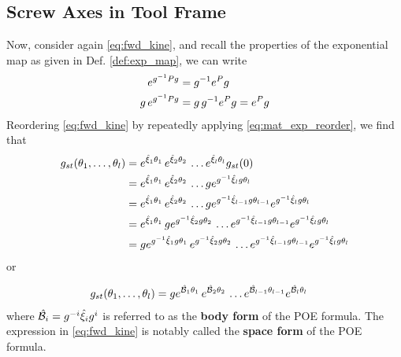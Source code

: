 \subsection{Screw Axes in Tool Frame}
%
Now, consider again \eqref{eq:fwd_kine}, and recall the properties of the exponential map as given in Def. \autoref{def:exp_map}, we can write 
%
\begin{subequations}
	\begin{align}
	e^{g^{-1}Pg} &= g^{-1} e^{P} g \\
	g \, e^{g^{-1}Pg} &= g \, g^{-1} e^{P} g = e^{P} g 
	\end{align}
	\label{eq:mat_exp_reorder}
\end{subequations}
%
Reordering \eqref{eq:fwd_kine} by repeatedly applying \eqref{eq:mat_exp_reorder}, we find that
%
\begin{subequations}
	\begin{align}
	g_{st}(\theta_1, \ldots, \theta_l) &= e^{\hat{\xi}_1 \theta_1}\,e^{\hat{\xi}_2 \theta_2}  \, \ldots e^{\hat{\xi}_l \theta_l} g_{st}(0) \\
	&= e^{\hat{\xi}_1 \theta_1}\,e^{\hat{\xi}_2 \theta_2}  \, \ldots g e^{g^{-1} \hat{\xi}_l g \theta_l}  \\
	&= e^{\hat{\xi}_1 \theta_1}\,e^{\hat{\xi}_2 \theta_2}  \, \ldots g e^{g^{-1} \hat{\xi}_{l-1}g\theta_{l-1}} e^{g^{-1} \hat{\xi}_{l} g \theta_l}  \\
	&= e^{\hat{\xi}_1 \theta_1}\,g e^{g^{-1} \hat{\xi}_{2}g\theta_{2}}   \, \ldots e^{g^{-1} \hat{\xi}_{l-1}g\theta_{l-1}} e^{g^{-1} \hat{\xi}_{l} g \theta_l}   \\
	&= g e^{g^{-1} \hat{\xi}_{1}g\theta_{1}}  \, e^{g^{-1} \hat{\xi}_{2}g\theta_{2}}   \, \ldots e^{g^{-1} \hat{\xi}_{l-1}g\theta_{l-1}} e^{g^{-1} \hat{\xi}_{l} g \theta_l}  
	\end{align}
	\label{eq:fwd_kine_rev}	
\end{subequations}
%
or 
%
\begin{tcolorbox}[title=Exponential Map in Tool Frame]
	\begin{align}
		g_{st}(\theta_1, \ldots, \theta_l) &= g e^{\hat{\mathcal{B}}_1\theta_{1}}  \, e^{\hat{\mathcal{B}}_2 \theta_{2}}   \, \ldots e^{\hat{\mathcal{B}}_{l-1} \theta_{l-1}} e^{\hat{\mathcal{B}}_{l} \theta_l} 
	\end{align}
	where $\hat{\mathcal{B}}_i = g^{-i} \hat{\xi}_{i}g^{i}$ is referred to as the \textbf{body form} of the POE formula. The expression in \eqref{eq:fwd_kine} is notably called the \textbf{space form} of the POE formula.
\end{tcolorbox}

